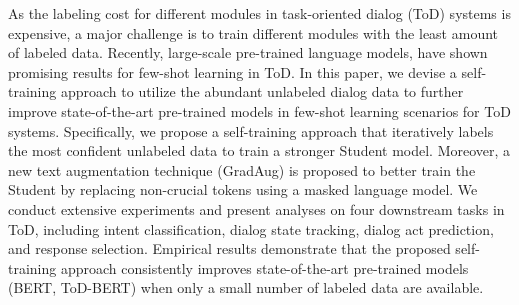 As the labeling cost for different modules in task-oriented dialog (ToD) systems is expensive, a major challenge is to train different modules with the least amount of labeled data. Recently, large-scale pre-trained language models, have shown promising results for few-shot learning in ToD. In this paper, we devise a self-training approach to utilize the abundant unlabeled dialog data to further improve state-of-the-art pre-trained models in few-shot learning scenarios for ToD systems. Specifically, we propose a self-training approach that iteratively labels the most confident unlabeled data to train a stronger Student model. Moreover, a new text augmentation technique (GradAug) is proposed to better train the Student by replacing non-crucial tokens using a masked language model. We conduct extensive experiments and present analyses on four downstream tasks in ToD, including intent classification, dialog state tracking, dialog act prediction, and response selection. Empirical results demonstrate that the proposed self-training approach consistently improves state-of-the-art pre-trained models (BERT, ToD-BERT) when only a small number of labeled data are available.

